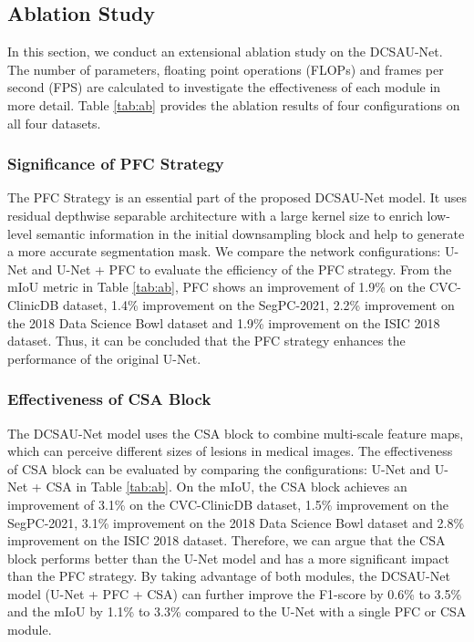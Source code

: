 \documentclass[a4paper,fleqn]{cas-dc}
\begin{document}
\subsection{Ablation Study}
In this section, we conduct an extensional ablation study on the DCSAU-Net. The number of parameters, floating point operations (FLOPs) and frames per second (FPS) are calculated to investigate the effectiveness of each module in more detail. Table \ref{tab:ab} provides the ablation results of four configurations on all four datasets. 
\subsubsection{Significance of PFC Strategy}
\label{sssec:spfc}
The PFC Strategy is an essential part of the proposed DCSAU-Net model. It uses residual depthwise separable architecture with a large kernel size to enrich low-level semantic information in the initial downsampling block and help to generate a more accurate segmentation mask. We compare the network configurations: U-Net and U-Net + PFC to evaluate the efficiency of the PFC strategy. From the mIoU metric in Table \ref{tab:ab}, PFC shows an improvement of 1.9\% on the CVC-ClinicDB dataset, 1.4\% improvement on the SegPC-2021, 2.2\% improvement on the 2018 Data Science Bowl dataset and 1.9\% improvement on the ISIC 2018 dataset. Thus, it can be concluded that the PFC strategy enhances the performance of the original U-Net.

\subsubsection{Effectiveness of CSA Block}
The DCSAU-Net model uses the CSA block to combine multi-scale feature maps, which can perceive different sizes of lesions in medical images. The effectiveness of CSA block can be evaluated by comparing the configurations: U-Net and U-Net + CSA in Table \ref{tab:ab}. On the mIoU, the CSA block achieves an improvement of 3.1\% on the CVC-ClinicDB dataset, 1.5\% improvement on the SegPC-2021, 3.1\% improvement on the 2018 Data Science Bowl dataset and 2.8\% improvement on the ISIC 2018 dataset. Therefore, we can argue that the CSA block performs better than the U-Net model and has a more significant impact than the PFC strategy. By taking advantage of both modules, the DCSAU-Net model (U-Net + PFC + CSA) can further improve the F1-score by 0.6\% to 3.5\% and the mIoU by 1.1\% to 3.3\% compared to the U-Net with a single PFC or CSA module.
\end{document}
